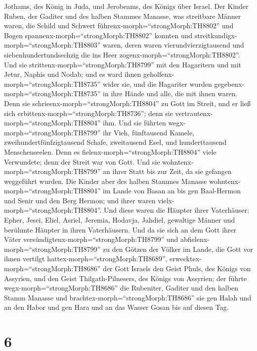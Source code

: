 Jothams, des König in Juda, und Jerobeams, des Königs über Israel.
 Der Kinder Ruben, der Gaditer und des halben Stammes
Manasse, was streitbare Männer waren, die Schild und Schwert
führenx-morph=``strongMorph:TH8802'' und Bogen
spannenx-morph=``strongMorph:TH8802'' konnten und
streitkundigx-morph=``strongMorph:TH8803'' waren, deren waren
vierundvierzigtausend und siebenhundertundsechzig die ins Heer
zogenx-morph=``strongMorph:TH8802''.  Und sie
strittenx-morph=``strongMorph:TH8799'' mit den Hagaritern und mit Jetur,
Naphis und Nodab;  und es ward ihnen
geholfenx-morph=``strongMorph:TH8735'' wider sie, und die Hagariter
wurden gegebenx-morph=``strongMorph:TH8735'' in ihre Hände und alle, die
mit ihnen waren. Denn sie schrieenx-morph=``strongMorph:TH8804'' zu Gott
im Streit, und er ließ sich erbittenx-morph=``strongMorph:TH8736''; denn
sie vertrautenx-morph=``strongMorph:TH8804'' ihm.  Und sie
führten wegx-morph=``strongMorph:TH8799'' ihr Vieh, fünftausend Kamele,
zweihundertfünfzigtausend Schafe, zweitausend Esel, und hunderttausend
Menschenseelen.  Denn es
fielenx-morph=``strongMorph:TH8804'' viele Verwundete; denn der Streit
war von Gott. Und sie wohntenx-morph=``strongMorph:TH8799'' an ihrer
Statt bis zur Zeit, da sie gefangen weggeführt wurden.  Die
Kinder aber des halben Stammes Manasse
wohntenx-morph=``strongMorph:TH8804'' im Lande von Basan an bis gen
Baal-Hermon und Senir und den Berg Hermon; und ihrer waren
vielx-morph=``strongMorph:TH8804''.  Und diese waren die
Häupter ihrer Vaterhäuser: Epher, Jesei, Eliel, Asriel, Jeremia,
Hodavja, Jahdiel, gewaltige Männer und berühmte Häupter in ihren
Vaterhäusern.  Und da sie sich an dem Gott ihrer Väter
versündigtenx-morph=``strongMorph:TH8799'' und
abfielenx-morph=``strongMorph:TH8799'' zu den Götzen der Völker im
Lande, die Gott vor ihnen vertilgt hattex-morph=``strongMorph:TH8689'',
 erwecktex-morph=``strongMorph:TH8686'' der Gott Israels
den Geist Phuls, des Königs von Assyrien, und den Geist
Thilgath-Pilnesers, des Königs von Assyrien; der führte
wegx-morph=``strongMorph:TH8686'' die Rubeniter, Gaditer und den halben
Stamm Manasse und brachtex-morph=``strongMorph:TH8686'' sie gen Halah
und an den Habor und gen Hara und an das Wasser Gosan bis auf diesen
Tag.

\hypertarget{section-5}{%
\section{6}\label{section-5}}

